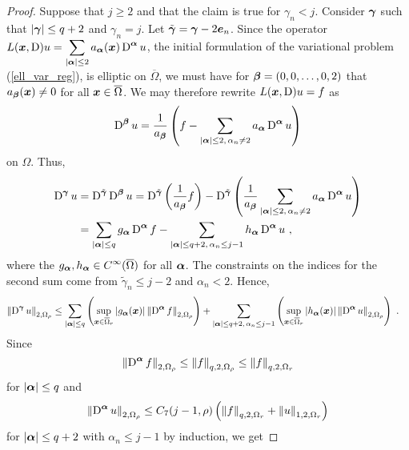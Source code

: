 \begin{proof}
Suppose that $j\geq 2$ and that the claim is true for $\gamma_n<j$.
Consider ${\bm{\gamma}}$ such that $|{\bm{\gamma}}| \leq q+2$ and
$\gamma_n = j$.  Let $\tilde{{\bm{\gamma}}} = {\bm{\gamma}} - 2 {\bm{e}}_n$.
Since the operator
$\displaystyle
L({\bm{x}},\operatorname{D})u = \sum_{|{\bm{\alpha}}|\leq 2} a_{{\bm{\alpha}}}({\bm{x}})
\operatorname{D}^{{\bm{\alpha}}} u$,
the initial formulation of the variational problem
(\ref{ell_var_reg}), is elliptic on $\overline{\Omega}$, we must have
for ${\bm{\beta}} = (0,0,\ldots,0,2)$ that
$a_{{\bm{\beta}}}({\bm{x}}) \neq 0$ for all ${\bm{x}} \in \overline{\Omega}$.
We may therefore rewrite $L({\bm{x}},\operatorname{D})u = f$ as
\[
\operatorname{D}^{{\bm{\beta}}} u = \frac{1}{a_{{\bm{\beta}}}} \left( f -
\sum_{|{\bm{\alpha}}|\leq 2,\, \alpha_n\neq 2} a_{{\bm{\alpha}}}
\operatorname{D}^{{\bm{\alpha}}} u \right)
\]
on $\Omega$.  Thus,
\begin{align*}
\operatorname{D}^{{\bm{\gamma}}} u &= \operatorname{D}^{\tilde{{\bm{\gamma}}}} \operatorname{D}^{{\bm{\beta}}} u
= \operatorname{D}^{\tilde{{\bm{\gamma}}}}\left(
\frac{1}{a_{{\bm{\beta}}}} f \right) - \operatorname{D}^{\tilde{{\bm{\gamma}}}}
\left( \frac{1}{a_{{\bm{\beta}}}}
\sum_{|{\bm{\alpha}}|\leq 2,\, \alpha_n\neq 2} a_{{\bm{\alpha}}}
\operatorname{D}^{{\bm{\alpha}}} u \right) \\
&= \sum_{|{\bm{\alpha}}|\leq q} g_{{\bm{\alpha}}} \operatorname{D}^{{\bm{\alpha}}} f
- \sum_{|{\bm{\alpha}}|\leq q+2,\, \alpha_n\leq j-1} h_{{\bm{\alpha}}}
\operatorname{D}^{{\bm{\alpha}}} u \ ,
\end{align*}
where the $\displaystyle g_{{\bm{\alpha}}}, h_{{\bm{\alpha}}}
\in C^\infty(\overline{\Omega})$
for all ${\bm{\alpha}}$.  The constraints on the indices for the second sum come
from $\tilde{\gamma}_n \leq j-2$ and $\alpha_n <2$.  Hence,
\begin{align*}
\left\| \operatorname{D}^{{\bm{\gamma}}} u \right\|_{2,\Omega_\rho}
&\leq \sum_{|{\bm{\alpha}}|\leq q} \left(
\sup_{{\bm{x}}\in \overline{\Omega}_r} \left| g_{{\bm{\alpha}}}({\bm{x}}) \right|
\left\| \operatorname{D}^{{\bm{\alpha}}} f \right\|_{2,\Omega_\rho}\right)
+ \sum_{|{\bm{\alpha}}|\leq q+2,\, \alpha_n\leq j-1} \left(
\sup_{{\bm{x}}\in \overline{\Omega}_r} \left| h_{{\bm{\alpha}}}({\bm{x}}) \right|
\left\| \operatorname{D}^{{\bm{\alpha}}}u \right\|_{2,\Omega_\rho} \right) \ .
\end{align*}
Since
\[
\left\| \operatorname{D}^{{\bm{\alpha}}} f \right\|_{2,\Omega_\rho} \leq
\left\| f \right\|_{q,2,\Omega_\rho} \leq
\left\| f \right\|_{q,2,\Omega_r}
\]
for $|{\bm{\alpha}}|\leq q$ and
\[
\left\| \operatorname{D}^{{\bm{\alpha}}} u \right\|_{2,\Omega_\rho} \leq
C_7(j-1,\rho) \left(
\left\|f\right\|_{q,2,\Omega_r} + \left\|u\right\|_{1,2,\Omega_r} \right)
\]
for $|{\bm{\alpha}}|\leq q+2$ with $\alpha_n\leq j-1$ by induction, we get

\end{proof}
